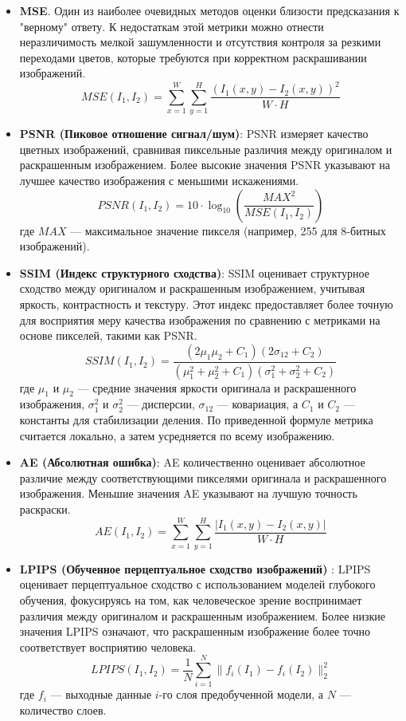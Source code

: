 \documentclass[14pt]{article}
\begin{document}
\begin{itemize}
    \item \textbf{MSE}. Один из наиболее очевидных методов оценки близости предсказания к "верному" ответу.
    К недостаткам этой метрики можно отнести неразличимость мелкой зашумленности и отсутствия контроля за резкими переходами цветов,
    которые требуются при корректном раскрашивании изображений.
    $$
        MSE(I_1, I_2) = \sum_{x=1}^{W} \sum_{y=1}^{H} \frac{(I_1(x,y) - I_2(x,y))^2}{W \cdot H}
    $$

    \item \textbf{PSNR (Пиковое отношение сигнал/шум)}: PSNR измеряет качество цветных изображений, сравнивая пиксельные различия между оригиналом и
    раскрашенным изображением. Более высокие значения PSNR указывают на лучшее качество изображения с меньшими искажениями.
    $$
        PSNR(I_1, I_2) = 10 \cdot \log_{10} \left( \frac{MAX^2}{MSE(I_1, I_2)} \right)
    $$
    где $MAX$ --- максимальное значение пикселя (например, 255 для 8-битных изображений).

    \item \textbf{SSIM (Индекс структурного сходства)}: SSIM оценивает структурное сходство между оригиналом и раскрашенным изображением,
    учитывая яркость, контрастность и текстуру. Этот индекс предоставляет более точную для восприятия меру качества изображения по сравнению
    с метриками на основе пикселей, такими как PSNR.
    $$
        SSIM(I_1, I_2) = \frac{(2 \mu_1 \mu_2 + C_1)(2 \sigma_{12} + C_2)}{(\mu_1^2 + \mu_2^2 + C_1)(\sigma_1^2 + \sigma_2^2 + C_2)}
    $$
    где $\mu_1$ и $\mu_2$ --- средние значения яркости оригинала и раскрашенного изображения, $\sigma_1^2$ и $\sigma_2^2$ --- дисперсии,
    $\sigma_{12}$ --- ковариация, а $C_1$ и $C_2$ --- константы для стабилизации деления. По приведенной формуле метрика считается локально,
    а затем усредняется по всему изображению.


    \item \textbf{AE (Абсолютная ошибка)}: AE количественно оценивает абсолютное различие между соответствующими пикселями оригинала и
    раскрашенного изображения. Меньшие значения AE указывают на лучшую точность раскраски.
    $$
        AE(I_1, I_2) = \sum_{x=1}^{W} \sum_{y=1}^{H} \frac{|I_1(x,y) - I_2(x,y)|}{W \cdot H}
    $$


    \item \textbf{LPIPS (Обученное перцептуальное сходство изображений)} \cite{PerceptualMetric}: LPIPS оценивает перцептуальное сходство с использованием моделей
    глубокого обучения, фокусируясь на том, как человеческое зрение воспринимает различия между оригиналом и раскрашенным изображением.
    Более низкие значения LPIPS означают, что раскрашенным изображение более точно соответствует восприятию человека.
    $$
        LPIPS(I_1, I_2) = \frac{1}{N} \sum_{i=1}^{N} \| f_i(I_1) - f_i(I_2) \|_2^2
    $$
    где $f_i$ --- выходные данные $i$-го слоя предобученной модели, а $N$ --- количество слоев.
\end{itemize}
\end{document}
